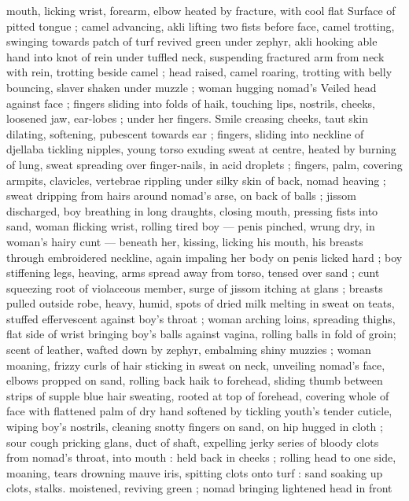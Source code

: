 {mouth, licking wrist, forearm, elbow heated by fracture, with cool flat 
Surface of pitted tongue ; camel advancing, akli lifting two fists 
before face, camel trotting, swinging towards patch of turf revived 
green under zephyr, akli hooking able hand into knot of rein under 
tuffled neck, suspending fractured arm from neck with rein, trotting 
beside camel ; head raised, camel roaring, trotting with belly 
bouncing, slaver shaken under muzzle ; woman hugging nomad's 
Veiled head against face ; fingers sliding into folds of haik, touching 
lips, nostrils, cheeks, loosened jaw, ear-lobes ; under her fingers. 
Smile creasing cheeks, taut skin dilating, softening, pubescent 
towards ear ; fingers, sliding into neckline of djellaba tickling 
nipples, young torso exuding sweat at centre, heated by burning of 
lung, sweat spreading over finger-nails, in acid droplets ; fingers, 
palm, covering armpits, clavicles, vertebrae rippling under silky skin 
of back, nomad heaving ; sweat dripping from hairs around nomad's 
arse, on back of balls ; jissom discharged, boy breathing in long 
draughts, closing mouth, pressing fists into sand, woman flicking 
wrist, rolling tired boy --- penis pinched, wrung dry, in woman's hairy 
cunt --- beneath her, kissing, licking his mouth, his breasts through 
embroidered neckline, again impaling her body on penis licked hard 
; boy stiffening legs, heaving, arms spread away from torso, tensed 
over sand ; cunt squeezing root of violaceous member, surge of 
jissom itching at glans ; breasts pulled outside robe, heavy, humid, 
spots of dried milk melting in sweat on teats, stuffed effervescent 
against boy's throat ; woman arching loins, spreading thighs, flat 
side of wrist bringing boy's balls against vagina, rolling balls in fold 
of groin; scent of leather, wafted down by zephyr, embalming shiny 
muzzies ; woman moaning, frizzy curls of hair sticking in sweat on 
neck, unveiling nomad's face, elbows propped on sand, rolling back 
haik to forehead, sliding thumb between strips of supple blue hair 
sweating, rooted at top of forehead, covering whole of face with 
flattened palm of dry hand softened by tickling youth's tender 
cuticle, wiping boy's nostrils, cleaning snotty fingers on sand, on hip 
hugged in cloth ; sour cough pricking glans, duct of shaft, expelling 
jerky series of bloody clots from nomad's throat, into mouth : held 
back in cheeks ; rolling head to one side, moaning, tears drowning 
mauve iris, spitting clots onto turf : sand soaking up clots, stalks. 
moistened, reviving green ; nomad bringing lightened head in front 
}
